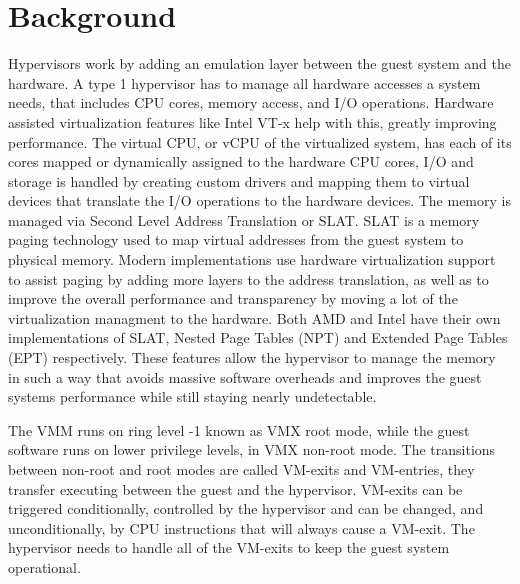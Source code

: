 \section{Background}\label{s:background}



Hypervisors work by adding an emulation layer between the guest system and the hardware. A type 1 hypervisor has to manage all hardware accesses a system needs, 
that includes CPU cores, memory access, and I/O operations. Hardware assisted virtualization features like Intel VT-x help with this, greatly improving performance. 
The virtual CPU, or vCPU of the virtualized system, has each of its cores mapped or dynamically assigned to the hardware CPU cores, 
I/O and storage is handled by creating custom drivers and mapping them to virtual devices that translate the I/O operations to the hardware devices. 
The memory is managed via Second Level Address Translation or SLAT. SLAT is a memory paging technology used to map virtual addresses from the guest system to physical memory. 
Modern implementations use hardware virtualization support to assist paging by adding more layers to the address translation, as well as 
to improve the overall performance and transparency by moving a lot of the virtualization managment to the hardware. 
Both AMD and Intel have their own implementations of SLAT, Nested Page Tables (NPT) and Extended Page Tables (EPT) respectively.
These features allow the hypervisor to manage the memory in such a way that avoids massive software overheads and improves the guest systems performance 
while still staying nearly undetectable. 

The VMM runs on ring level -1 known as VMX root mode, while the guest software runs on lower privilege levels, 
in VMX non-root mode. The transitions between non-root and root modes are called VM-exits and VM-entries, they transfer executing between the guest and the hypervisor. 
VM-exits can be triggered conditionally, controlled by the hypervisor and can be changed, and unconditionally, by CPU instructions that will always cause a VM-exit. 
The hypervisor needs to handle all of the VM-exits to keep the guest system operational.


